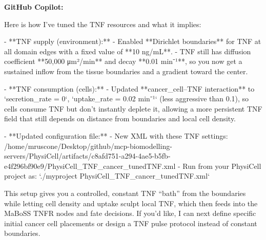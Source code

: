 \documentclass[11pt,a4paper]{article}
\begin{document}
\begin{copilotbox}
\textbf{GitHub Copilot:}

Here is how I’ve tuned the TNF resources and what it implies:

- **TNF supply (environment):**
  - Enabled **Dirichlet boundaries** for TNF at all domain edges with a fixed value of **10 ng/mL**.
  - TNF still has diffusion coefficient **50,000 μm²/min** and decay **0.01 min⁻¹**, so you now get a sustained inflow from the tissue boundaries and a gradient toward the center.

- **TNF consumption (cells):**
  - Updated **cancer\_cell–TNF interaction** to `secretion\_rate = 0`, `uptake\_rate = 0.02 min⁻¹` (less aggressive than 0.1), so cells consume TNF but don’t instantly deplete it, allowing a more persistent TNF field that still depends on distance from boundaries and local cell density.

- **Updated configuration file:**
  - New XML with these TNF settings:  
    /home/mruscone/Desktop/github/mcp-biomodelling-servers/PhysiCell/artifacts/c8afd751-a294-4ae5-b5fb-e4f296bf90e9/PhysiCell\_TNF\_cancer\_tunedTNF.xml  
  - Run from your PhysiCell project as:  
    `./myproject PhysiCell\_TNF\_cancer\_tunedTNF.xml`

This setup gives you a controlled, constant TNF “bath” from the boundaries while letting cell density and uptake sculpt local TNF, which then feeds into the MaBoSS TNFR nodes and fate decisions. If you’d like, I can next define specific initial cancer cell placements or design a TNF pulse protocol instead of constant boundaries.

\end{copilotbox}
\end{document}
